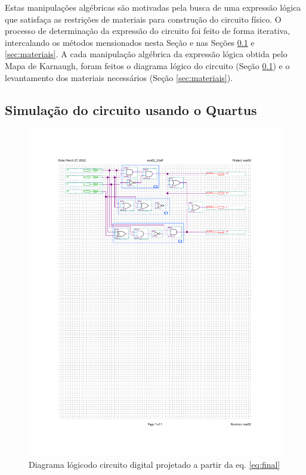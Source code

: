 \documentclass[a4,12pt]{horizon-theme}
\begin{document}
Estas manipulações algébricas são motivadas pela busca de uma expressão lógica que satisfaça as restrições de materiais para construção do circuito físico. O processo de determinação da expressão do circuito foi feito de forma iterativa, intercalando os métodos mensionados nesta Seção e nas Seções \ref{sec:sim} e \ref{sec:materiais}. A cada manipulação algébrica da expressão lógica obtida pelo Mapa de Karnaugh, foram feitos o diagrama lógico do circuito (Seção \ref{sec:sim}) e o levantamento dos materiais necessários (Seção \ref{sec:materiais}).


\subsection{Simulação do circuito usando o Quartus}
\label{sec:sim}

\begin{figure}[!ht]
  \centering
  \includegraphics[width=\textwidth, trim={31mm 182mm 30mm 31mm}, clip]{diagrama_logico_v2.pdf}
  \caption[]{Diagrama lógico\footnotemark do circuito digital projetado a partir da eq. \eqref{eq:final}}
  \label{fig:diagrama_logico}
\end{figure}
\end{document}
